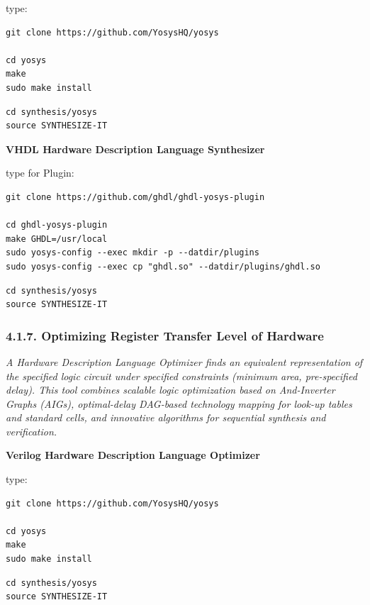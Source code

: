 \documentclass[
]{article}
\begin{document}
type:

\begin{verbatim}
git clone https://github.com/YosysHQ/yosys

cd yosys
make
sudo make install
\end{verbatim}

\begin{verbatim}
cd synthesis/yosys
source SYNTHESIZE-IT
\end{verbatim}

\textbf{VHDL Hardware Description Language Synthesizer}

type for Plugin:

\begin{verbatim}
git clone https://github.com/ghdl/ghdl-yosys-plugin

cd ghdl-yosys-plugin
make GHDL=/usr/local
sudo yosys-config --exec mkdir -p --datdir/plugins
sudo yosys-config --exec cp "ghdl.so" --datdir/plugins/ghdl.so
\end{verbatim}

\begin{verbatim}
cd synthesis/yosys
source SYNTHESIZE-IT
\end{verbatim}

\hypertarget{optimizing-register-transfer-level-of-hardware}{%
\subsubsection{4.1.7. Optimizing Register Transfer Level of
Hardware}\label{optimizing-register-transfer-level-of-hardware}}

\emph{A Hardware Description Language Optimizer finds an equivalent
representation of the specified logic circuit under specified
constraints (minimum area, pre-specified delay). This tool combines
scalable logic optimization based on And-Inverter Graphs (AIGs),
optimal-delay DAG-based technology mapping for look-up tables and
standard cells, and innovative algorithms for sequential synthesis and
verification.}

\textbf{Verilog Hardware Description Language Optimizer}

type:

\begin{verbatim}
git clone https://github.com/YosysHQ/yosys

cd yosys
make
sudo make install
\end{verbatim}

\begin{verbatim}
cd synthesis/yosys
source SYNTHESIZE-IT
\end{verbatim}
\end{document}
